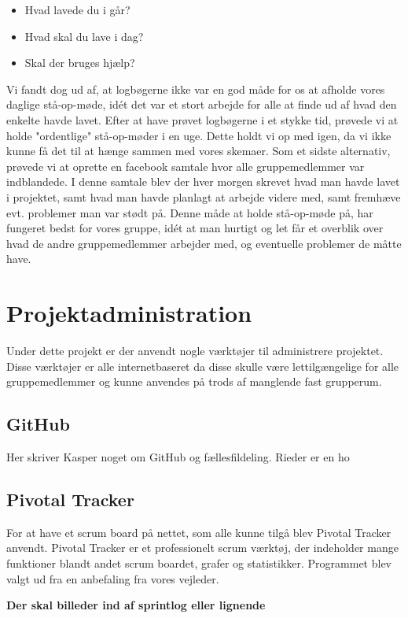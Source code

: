 \begin{itemize}
	\item Hvad lavede du i går?
	\item Hvad skal du lave i dag?
	\item Skal der bruges hjælp?
\end{itemize} 

Vi fandt dog ud af, at logbøgerne ikke var en god måde for os at afholde vores daglige stå-op-møde, idét det var et stort arbejde for alle at finde ud af hvad den enkelte havde lavet. Efter at have prøvet logbøgerne i et stykke tid, prøvede vi at holde "ordentlige" stå-op-møder i en uge. Dette holdt vi op med igen, da vi ikke kunne få det til at hænge sammen med vores skemaer. Som et sidste alternativ, prøvede vi at oprette en facebook samtale hvor alle gruppemedlemmer var indblandede. I denne samtale blev der hver morgen skrevet hvad man havde lavet i projektet, samt hvad man havde planlagt at arbejde videre med, samt fremhæve evt. problemer man var stødt på. Denne måde at holde stå-op-møde på, har fungeret bedst for vores gruppe, idét at man hurtigt og let får et overblik over hvad de andre gruppemedlemmer arbejder med, og eventuelle problemer de måtte have.

\section{Projektadministration}
Under dette projekt er der anvendt nogle værktøjer til administrere projektet. Disse værktøjer er alle internetbaseret da disse skulle være lettilgængelige for alle gruppemedlemmer og kunne anvendes på trods af manglende fast grupperum.

\subsection{GitHub}
Her skriver Kasper noget om GitHub og fællesfildeling. 
Rieder er en ho

\subsection{Pivotal Tracker}
For at have et scrum board på nettet, som alle kunne tilgå blev Pivotal Tracker anvendt. Pivotal Tracker er et professionelt scrum værktøj, der indeholder mange funktioner blandt andet scrum boardet, grafer og statistikker. Programmet blev valgt ud fra en anbefaling fra vores vejleder.

\textbf{Der skal billeder ind af sprintlog eller lignende} 

